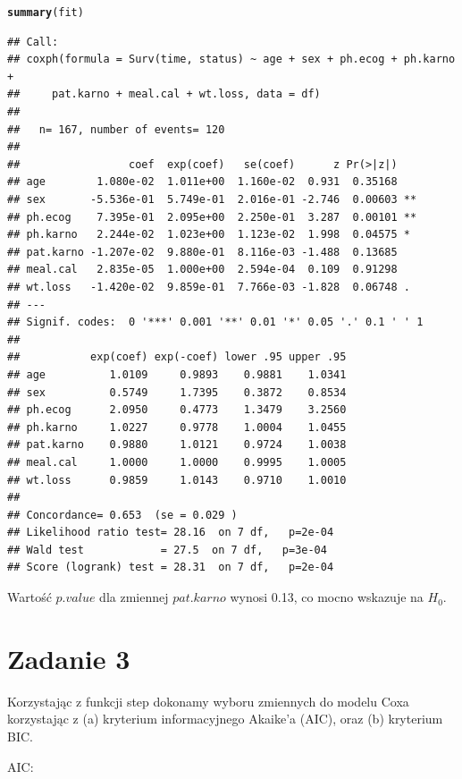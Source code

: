 \documentclass[12pt, a4paper]{article}\usepackage[]{graphicx}\usepackage[]{color}
\makeatletter
\newcommand{\hlstd}[1]{\textcolor[rgb]{0.345,0.345,0.345}{#1}}%
\newcommand{\hlkwd}[1]{\textcolor[rgb]{0.737,0.353,0.396}{\textbf{#1}}}%
\newenvironment{kframe}{%
 \def\at@end@of@kframe{}%
 \ifinner\ifhmode%
  \def\at@end@of@kframe{\end{minipage}}%
  \begin{minipage}{\columnwidth}%
 \fi\fi%
 \def\FrameCommand##1{\hskip\@totalleftmargin \hskip-\fboxsep
 \colorbox{shadecolor}{##1}\hskip-\fboxsep
     \hskip-\linewidth \hskip-\@totalleftmargin \hskip\columnwidth}%
 \MakeFramed {\advance\hsize-\width
   \@totalleftmargin\z@ \linewidth\hsize
   \@setminipage}}%
 {\par\unskip\endMakeFramed%
 \at@end@of@kframe}
\newenvironment{knitrout}{}{} %
\makeatother
\begin{document}
\begin{knitrout}
\color{fgcolor}\begin{kframe}
\begin{alltt}
\hlkwd{summary}\hlstd{(fit)}
\end{alltt}
\begin{verbatim}
## Call:
## coxph(formula = Surv(time, status) ~ age + sex + ph.ecog + ph.karno + 
##     pat.karno + meal.cal + wt.loss, data = df)
## 
##   n= 167, number of events= 120 
## 
##                 coef  exp(coef)   se(coef)      z Pr(>|z|)   
## age        1.080e-02  1.011e+00  1.160e-02  0.931  0.35168   
## sex       -5.536e-01  5.749e-01  2.016e-01 -2.746  0.00603 **
## ph.ecog    7.395e-01  2.095e+00  2.250e-01  3.287  0.00101 **
## ph.karno   2.244e-02  1.023e+00  1.123e-02  1.998  0.04575 * 
## pat.karno -1.207e-02  9.880e-01  8.116e-03 -1.488  0.13685   
## meal.cal   2.835e-05  1.000e+00  2.594e-04  0.109  0.91298   
## wt.loss   -1.420e-02  9.859e-01  7.766e-03 -1.828  0.06748 . 
## ---
## Signif. codes:  0 '***' 0.001 '**' 0.01 '*' 0.05 '.' 0.1 ' ' 1
## 
##           exp(coef) exp(-coef) lower .95 upper .95
## age          1.0109     0.9893    0.9881    1.0341
## sex          0.5749     1.7395    0.3872    0.8534
## ph.ecog      2.0950     0.4773    1.3479    3.2560
## ph.karno     1.0227     0.9778    1.0004    1.0455
## pat.karno    0.9880     1.0121    0.9724    1.0038
## meal.cal     1.0000     1.0000    0.9995    1.0005
## wt.loss      0.9859     1.0143    0.9710    1.0010
## 
## Concordance= 0.653  (se = 0.029 )
## Likelihood ratio test= 28.16  on 7 df,   p=2e-04
## Wald test            = 27.5  on 7 df,   p=3e-04
## Score (logrank) test = 28.31  on 7 df,   p=2e-04
\end{verbatim}
\end{kframe}
\end{knitrout}

Wartość $p.value$ dla zmiennej $pat.karno$ wynosi 0.13, co mocno wskazuje na $H_0$.

\section{Zadanie 3}

Korzystając z funkcji step dokonamy wyboru zmiennych do modelu Coxa korzystając z (a) kryterium
informacyjnego Akaike’a (AIC), oraz (b) kryterium BIC.

AIC: 
\end{document}
